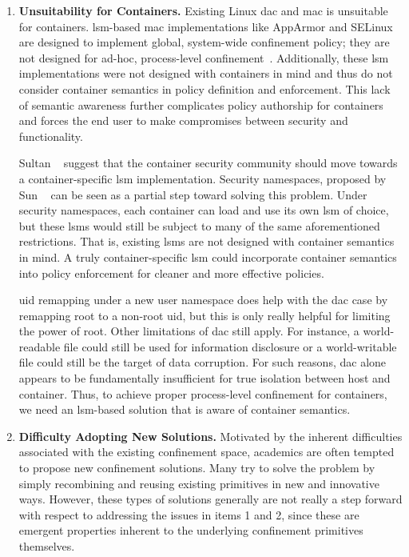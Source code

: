 \begin{enumerate}[font=\bfseries]
  \item \label{i:problem-unsuitability} \textbf{Unsuitability for Containers.}
    Existing Linux \gls{dac} and \gls{mac} is unsuitable for containers.
    \gls{lsm}-based \gls{mac} implementations like AppArmor and SELinux are
    designed to implement global, system-wide confinement policy; they are not designed
    for ad-hoc, process-level confinement~\cite{belair2019_leveraging}. Additionally,
    these \gls{lsm} implementations were not designed with containers in mind and thus
    do not consider container semantics in policy definition and enforcement. This lack
    of semantic awareness further complicates policy authorship for containers and
    forces the end user to make compromises between security and functionality.

    Sultan \etal~\cite{sultan2019_container_security} suggest that the container
    security community should move towards a container-specific \gls{lsm}
    implementation. Security namespaces, proposed by Sun
    \etal~\cite{sun2018_security_namespace} can be seen as a partial step toward solving
    this problem.  Under security namespaces, each container can load and use its own
    \gls{lsm} of choice, but these \glspl{lsm} would still be subject to many of the
    same aforementioned restrictions. That is, existing \glspl{lsm} are not designed
    with container semantics in mind. A truly container-specific \gls{lsm} could incorporate
    container semantics into policy enforcement for cleaner and more effective policies.

    \gls{uid} remapping under a new user namespace does help with the \gls{dac} case by
    remapping root to a non-root \gls{uid}, but this is only really helpful for limiting
    the power of root. Other limitations of \gls{dac} still apply. For instance,
    a world-readable file could still be used for information disclosure or
    a world-writable file could still be the target of data corruption. For such reasons,
    \gls{dac} alone appears to be fundamentally insufficient for true isolation between
    host and container. Thus, to achieve proper process-level confinement for containers,
    we need an \gls{lsm}-based solution that is aware of container semantics.

  \item \label{i:problem-adoptability} \textbf{Difficulty Adopting New Solutions.}
    Motivated by the inherent difficulties associated with the existing confinement space,
    academics are often tempted to propose new confinement solutions. Many try to solve
    the problem by simply recombining and reusing existing primitives in new and
    innovative ways.  However, these types of solutions generally are not really a step
    forward with respect to addressing the issues in items 1 and 2, since these are
    emergent properties inherent to the underlying confinement primitives themselves.


\end{enumerate}
